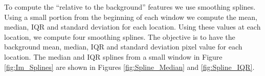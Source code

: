 \documentclass[a4paper,11pt]{article}
\begin{document}
To compute the ``relative to the background'' features we use smoothing splines. Using a small portion from the beginning of each window we compute the mean, median, IQR and standard deviation for each location. Using these values at each location, we compute four smoothing splines. The objective is to have the background mean, median, IQR and standard deviation pixel value for each location. The median and IQR splines from a small window in Figure \ref{fig:Im_Splines} are shown in Figures \ref{fig:Spline_Median} and \ref{fig:Spline_IQR}. %

\begin{figure}[H]
	\centering
\end{figure}
\end{document}
